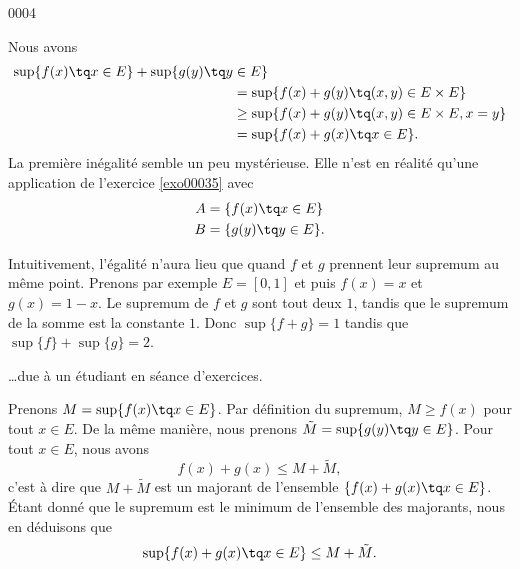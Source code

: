 
\begin{corrige}{0004}

Nous avons
\begin{equation}
	\begin{aligned}[]
		\sup\{ f(x)\tq x\in E \}+\sup\{ g(y)\tq y&\in E \}\\
							&=\sup\{ f(x)+g(y)\tq (x,y)\in E\times E \}\\
									&\geq\sup\{  f(x)+g(y)\tq (x,y)\in E\times E, x=y \} \\
							&=\sup\{ f(x)+g(x)\tq x\in E \}.
	\end{aligned}
\end{equation}
La première inégalité semble un peu mystérieuse. Elle n'est en réalité qu'une application de l'exercice \ref{exo00035} avec
\begin{equation}
	\begin{aligned}[]
		A&=\{ f(x)\tq x\in E \}\\
		B&=\{ g(y)\tq y\in E \}.
	\end{aligned}
\end{equation}

Intuitivement, l'égalité n'aura lieu que quand $f$ et $g$ prennent leur supremum au même point. Prenons par exemple $E=[0,1]$ et puis $f(x)=x$ et $g(x)=1-x$. Le supremum de $f$ et $g$ sont tout deux $1$, tandis que le supremum de la somme est la constante $1$. Donc $\sup\{ f+g \}=1$ tandis que $\sup\{ f \}+\sup\{ g \}=2$.

\vspace{0.5cm}

\ldots due à un étudiant en séance d'exercices.

Prenons $M=\sup\{ f(x)\tq x\in E \}$. Par définition du supremum, $M\geq f(x)$ pour tout $x\in E$. De la même manière, nous prenons $\tilde M=\sup\{ g(y)\tq y\in E \}$. Pour tout $x\in E$, nous avons
\begin{equation}
	f(x)+g(x)\leq M+\tilde M,
\end{equation}
c'est à dire que $M+\tilde M$ est un majorant de l'ensemble $\{ f(x)+g(x)\tq x\in E \}$. Étant donné que le supremum est le minimum de l'ensemble des majorants, nous en déduisons que
\begin{equation}
	\sup\{ f(x)+g(x)\tq x\in E \}\leq M+\tilde M.
\end{equation}

\end{corrige}
